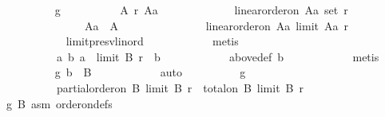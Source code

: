 \begin{isabellebody}
\ \ \ \ \ \ \ \ \isamarkupfalse%
\ g{}{\isacharcolon}{\kern0pt}\isanewline
\ \ \ \ \ \ \ \ \ \ {\isachardoublequoteopen}{\isasymforall}A\ r\ Aa{\isachardot}{\kern0pt}\isanewline
\ \ \ \ \ \ \ \ \ \ \ \ {\isasymnot}\ linear{\isacharunderscore}{\kern0pt}order{\isacharunderscore}{\kern0pt}on\ {\isacharparenleft}{\kern0pt}A{\isacharcolon}{\kern0pt}{\isacharcolon}{\kern0pt}{\isacharprime}{\kern0pt}a\ set{\isacharparenright}{\kern0pt}\ r\ {\isasymor}\isanewline
\ \ \ \ \ \ \ \ \ \ \ \ \ \ {\isasymnot}\ Aa\ {\isasymsubseteq}\ A\ {\isasymor}\isanewline
\ \ \ \ \ \ \ \ \ \ \ \ \ \ linear{\isacharunderscore}{\kern0pt}order{\isacharunderscore}{\kern0pt}on\ Aa\ {\isacharparenleft}{\kern0pt}limit\ Aa\ r{\isacharparenright}{\kern0pt}{\isachardoublequoteclose}\isanewline
\ \ \ \ \ \ \ \ \ \ \isamarkupfalse%
\ limit{\isacharunderscore}{\kern0pt}presv{\isacharunderscore}{\kern0pt}lin{\isacharunderscore}{\kern0pt}ord\isanewline
\ \ \ \ \ \ \ \ \ \ \isamarkupfalse%
\ metis\isanewline
\ \ \ \ \ \ \ \ \isamarkupfalse%
\isanewline
\ \ \ \ \ \ \ \ \ \ {\isachardoublequoteopen}{\isacharbraceleft}{\kern0pt}a{\isachardot}{\kern0pt}\ {\isacharparenleft}{\kern0pt}b{\isacharcomma}{\kern0pt}\ a{\isacharparenright}{\kern0pt}\ {\isasymin}\ limit\ B\ r{\isacharbraceright}{\kern0pt}\ {\isacharequal}{\kern0pt}\ {\isacharbraceleft}{\kern0pt}b{\isacharbraceright}{\kern0pt}{\isachardoublequoteclose}\isanewline
\ \ \ \ \ \ \ \ \ \ \isamarkupfalse%
\ above{\isacharunderscore}{\kern0pt}def\ b\isanewline
\ \ \ \ \ \ \ \ \ \ \isamarkupfalse%
\ metis\isanewline
\ \ \ \ \ \ \ \ \isamarkupfalse%
\ g{}{\isacharcolon}{\kern0pt}\ {\isachardoublequoteopen}b\ {\isasymin}\ B{\isachardoublequoteclose}\isanewline
\ \ \ \ \ \ \ \ \ \ \isamarkupfalse%
\ auto\isanewline
\ \ \ \ \ \ \ \ \isamarkupfalse%
\ g{}{\isacharcolon}{\kern0pt}\isanewline
\ \ \ \ \ \ \ \ \ \ {\isachardoublequoteopen}partial{\isacharunderscore}{\kern0pt}order{\isacharunderscore}{\kern0pt}on\ B\ {\isacharparenleft}{\kern0pt}limit\ B\ r{\isacharparenright}{\kern0pt}\ {\isasymand}\ total{\isacharunderscore}{\kern0pt}on\ B\ {\isacharparenleft}{\kern0pt}limit\ B\ r{\isacharparenright}{\kern0pt}{\isachardoublequoteclose}\isanewline
\ \ \ \ \ \ \ \ \ \ \isamarkupfalse%
\ g{}\ B\ asm\ order{\isacharunderscore}{\kern0pt}on{\isacharunderscore}{\kern0pt}defs{\isacharparenleft}{\kern0pt}{}{\isacharparenright}{\kern0pt}\isanewline

\end{isabellebody}
